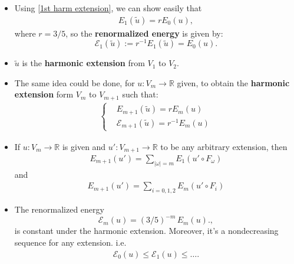 \begin{frame}
\begin{itemize}
    \item Using \eqref{1st harm extension}, we can show easily that 
    \begin{align}
        E_1(\tilde{u})=rE_0(u),
    \end{align}
    where $r=3/5$, so the \textbf{renormalized energy} is given by:
    $$
    \mathcal{E}_{1}(\tilde{u}):=r^{-1}E_1(\tilde{u})=E_0(u).
    $$
\item $\tilde{u}$ is the \textbf{harmonic extension} from $V_1$ to $V_2$.

\item The same idea could be done, for $u:V_m\rightarrow \mathbb{R}$ given, to obtain the \textbf{harmonic extension} form $V_m$ to $V_{m+1}$ such that:
\begin{align}
    \left\{ \begin{array}{cc}
        &E_{m+1}(\tilde{u})=rE_{m}(u)   \\
        &\mathcal{E}_{m+1}(\tilde{u})=r^{-1}E_{m}(u) 
    \end{array}\right.
\end{align}
\end{itemize}    
\end{frame}
\begin{frame}
    \begin{itemize}
        \item If $u:V_m\rightarrow \mathbb{R}$ is given and $u':V_{m+1}\rightarrow \mathbb{R}$ to be any arbitrary extension, then 
        \begin{align}
        E_{m+1}(u')=\underset{|\omega|=m}{\sum}E_1(u'\circ F_{\omega})    
        \end{align}
        and 
        \begin{align}
        E_{m+1}(u')=\underset{i=0,1,2}{\sum}E_m(u'\circ F_{i})    
        \end{align}
        
        \item The renormalized energy 
        $$
        \mathcal{E}_{m}(u)=(3/5)^{-m}\,E_{m}(u).,
        $$
        is constant under the harmonic extension. Moreover, it's a nondecreasing sequence for any extension. i.e.
        \begin{align}
            \mathcal{E}_{0}(u)\leq \mathcal{E}_{1}(u)\leq \ldots.
        \end{align}
    \end{itemize}
\end{frame}
